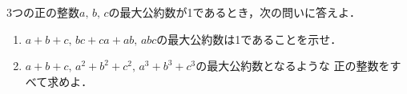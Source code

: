 \documentclass[../../main.tex]{subfiles}
\begin{document}
3つの正の整数$a, \, b, \, c$の最大公約数が1であるとき，次の問いに答えよ．
\begin{enumerate}
  \item$a+b+c, \, bc+ca+ab, \, abc$の最大公約数は1であることを示せ．
  \item$a+b+c, \, a^2+b^2+c^2, \, a^3+b^3+c^3$の最大公約数となるような
    正の整数をすべて求めよ．
\end{enumerate}
\end{document}
